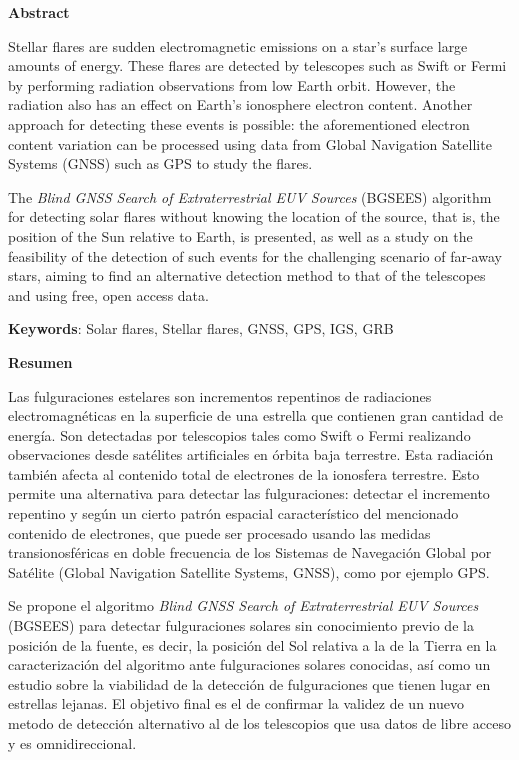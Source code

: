\thispagestyle{empty}
\begin{center}
    \Large
    \textbf{Abstract}
\end{center}
Stellar flares are sudden electromagnetic emissions on a star's surface  large amounts of energy. These flares are detected by telescopes such as Swift or Fermi by performing radiation observations from low Earth orbit. However, the radiation also has an effect on Earth’s ionosphere electron content. Another approach for detecting these events is possible: the aforementioned electron content variation can be processed using data from Global Navigation Satellite Systems (GNSS) such as GPS to study the flares.

The \textit{Blind GNSS Search of Extraterrestrial EUV Sources} (BGSEES) algorithm for detecting solar flares without knowing the location of the source, that is, the position of the Sun relative to Earth, is presented, as well as a study on the feasibility of the detection of such events for the challenging scenario of far-away stars, aiming to find an alternative detection method to that of the telescopes and using free, open access data.

\textbf{Keywords}: Solar flares, Stellar flares, GNSS, GPS, IGS, GRB

\clearpage
\thispagestyle{empty}
\begin{center}
	\Large
	\textbf{Resumen}
\end{center}
Las fulguraciones estelares son incrementos repentinos de radiaciones electromagnéticas en la superficie de una estrella que contienen gran cantidad de energía. Son detectadas por telescopios tales como Swift o Fermi realizando observaciones desde satélites artificiales en órbita baja terrestre. Esta radiación también afecta al contenido total de electrones de la ionosfera terrestre. Esto permite una alternativa para detectar las fulguraciones: detectar el incremento repentino y según un cierto patrón espacial característico del mencionado contenido de electrones, que puede ser procesado usando las medidas transionosféricas en doble frecuencia de los Sistemas de Navegación Global por Satélite (Global Navigation Satellite Systems, GNSS), como por ejemplo GPS.

Se propone el algoritmo \textit{Blind GNSS Search of Extraterrestrial EUV Sources} (BGSEES) para detectar fulguraciones solares sin conocimiento previo de la posición de la fuente, es decir, la posición del Sol relativa a la de la Tierra en la caracterización del algoritmo ante fulguraciones solares conocidas, así como un estudio sobre la viabilidad de la detección de fulguraciones que tienen lugar en estrellas lejanas. El objetivo final es el de confirmar la validez de un nuevo metodo de detección alternativo al de los telescopios que usa datos de libre acceso y es omnidireccional.

